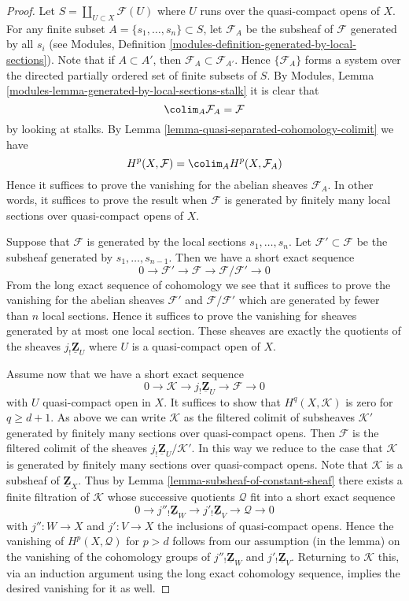 \begin{proof}
Let $S = \coprod_{U \subset X} \mathcal{F}(U)$ where $U$ runs over the
quasi-compact opens of $X$.
For any finite subset $A = \{s_1, \ldots, s_n\} \subset S$,
let $\mathcal{F}_A$ be the subsheaf of $\mathcal{F}$ generated
by all $s_i$ (see
Modules, Definition \ref{modules-definition-generated-by-local-sections}).
Note that if $A \subset A'$, then $\mathcal{F}_A \subset \mathcal{F}_{A'}$.
Hence $\{\mathcal{F}_A\}$ forms a system over the
directed partially ordered set of finite subsets of $S$.
By Modules, Lemma \ref{modules-lemma-generated-by-local-sections-stalk}
it is clear that
$$
\colim_A \mathcal{F}_A = \mathcal{F}
$$
by looking at stalks. By
Lemma \ref{lemma-quasi-separated-cohomology-colimit} we have
$$
H^p(X, \mathcal{F}) =
\colim_A H^p(X, \mathcal{F}_A)
$$
Hence it suffices to prove the vanishing for the abelian sheaves
$\mathcal{F}_A$. In other words, it suffices to prove the
result when $\mathcal{F}$ is generated by finitely many local sections
over quasi-compact opens of $X$.

\medskip\noindent
Suppose that $\mathcal{F}$ is generated by the local sections
$s_1, \ldots, s_n$. Let $\mathcal{F}' \subset \mathcal{F}$
be the subsheaf generated by $s_1, \ldots, s_{n - 1}$.
Then we have a short exact sequence
$$
0 \to \mathcal{F}' \to \mathcal{F} \to \mathcal{F}/\mathcal{F}' \to 0
$$
From the long exact sequence of cohomology we see that it suffices
to prove the vanishing for the abelian sheaves $\mathcal{F}'$
and $\mathcal{F}/\mathcal{F}'$ which are generated by fewer than
$n$ local sections. Hence it suffices to prove the vanishing
for sheaves generated by at most one local section. These sheaves
are exactly the quotients of the sheaves $j_!\underline{\mathbf{Z}}_U$
where $U$ is a quasi-compact open of $X$.

\medskip\noindent
Assume now that we have a short exact sequence
$$
0 \to \mathcal{K} \to j_!\underline{\mathbf{Z}}_U \to \mathcal{F} \to 0
$$
with $U$ quasi-compact open in $X$.
It suffices to show that $H^q(X, \mathcal{K})$ is zero for $q \geq d + 1$.
As above we can write $\mathcal{K}$ as the filtered colimit of
subsheaves $\mathcal{K}'$ generated by finitely many sections over
quasi-compact opens. Then $\mathcal{F}$ is the filtered colimit of the
sheaves $j_!\underline{\mathbf{Z}}_U/\mathcal{K}'$. In this way we
reduce to the case that $\mathcal{K}$ is generated by finitely many
sections over quasi-compact opens. Note that $\mathcal{K}$
is a subsheaf of $\underline{\mathbf{Z}}_X$. Thus by
Lemma \ref{lemma-subsheaf-of-constant-sheaf} there exists a finite
filtration of $\mathcal{K}$ whose successive quotients $\mathcal{Q}$ fit
into a short exact sequence
$$
0 \to j''_!\underline{\mathbf{Z}}_W \to
j'_!\underline{\mathbf{Z}}_V \to \mathcal{Q} \to 0
$$
with $j'' : W \to X$ and $j' : V \to X$ the inclusions of quasi-compact opens.
Hence the vanishing of $H^p(X, \mathcal{Q})$ for $p > d$ follows
from our assumption (in the lemma) on the vanishing of the cohomology groups
of $j''_!\underline{\mathbf{Z}}_W$ and $j'_!\underline{\mathbf{Z}}_V$.
Returning to $\mathcal{K}$ this, via an induction argument using the
long exact cohomology sequence, implies the desired vanishing for it as well.
\end{proof}

